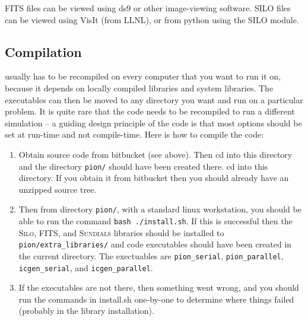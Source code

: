 \documentclass[a4paper,11pt]{report}
\begin{document}
FITS files can be viewed using ds9 or other image-viewing software.
SILO files can be viewed using VisIt (from LLNL), or from python using the SILO module.

\subsection{Compilation}
\pion{} usually has to be recompiled on every computer that you want to run it on, because it depends on locally compiled libraries and system libraries.
The executables can then be moved to any directory you want and run on a particular problem.
It is quite rare that the code needs to be recompiled to run a different simulation -- a guiding design principle of the code is that most options should be set at run-time and not compile-time.
Here is how to compile the code:
\begin{enumerate}
\item
  Obtain \pion{} source code from bitbucket (see above).
  Then cd into this directory and the directory \lstinline|pion/| should have been created there.  cd into this directory.
  If you obtain it from bitbucket then you should already have an unzipped source tree.
\item
  Then from directory \lstinline|pion/|, with a standard linux workstation, you should be able to run the command \lstinline|bash ./install.sh|.
  If this is successful then the \textsc{Silo}, \textsc{FITS}, and \textsc{Sundials} libraries should be installed to \lstinline|pion/extra_libraries/| and code executables should have been created in the current directory.
  The exectuables are \lstinline|pion_serial|, \lstinline|pion_parallel|, \lstinline|icgen_serial|, and \lstinline|icgen_parallel|.
\item
  If the executables are not there, then something went wrong, and you should run the commands in install.sh one-by-one to determine where things failed (probably in the library installation).
\end{enumerate}
\end{document}
